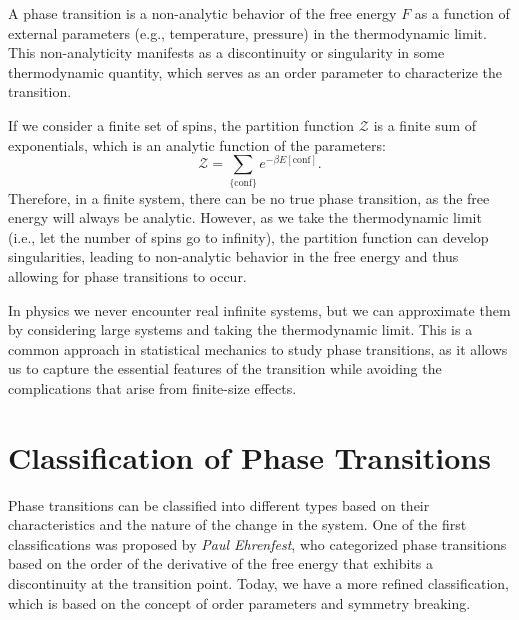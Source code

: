 \begin{definition}
    A phase transition is a non-analytic behavior of the free energy $F$ as a function of external parameters (e.g., temperature, pressure) in the thermodynamic limit. This non-analyticity manifests as a discontinuity or singularity in some thermodynamic quantity, which serves as an order parameter to characterize the transition.
\end{definition}

\begin{example}
    If we consider a finite set of spins, the partition function $\mathcal{Z}$ is a finite sum of exponentials, which is an analytic function of the parameters:
    \[
        \mathcal{Z} = \sum_{\{\text{conf}\}} e^{- \beta E[\text{conf}]}.
    \]
    Therefore, in a finite system, there can be no true phase transition, as the free energy will always be analytic. However, as we take the thermodynamic limit (i.e., let the number of spins go to infinity), the partition function can develop singularities, leading to non-analytic behavior in the free energy and thus allowing for phase transitions to occur.
\end{example}

In physics we never encounter real infinite systems, but we can approximate them by considering large systems and taking the thermodynamic limit. This is a common approach in statistical mechanics to study phase transitions, as it allows us to capture the essential features of the transition while avoiding the complications that arise from finite-size effects.

\section{Classification of Phase Transitions}

Phase transitions can be classified into different types based on their characteristics and the nature of the change in the system. One of the first classifications was proposed by \textit{Paul Ehrenfest}, who categorized phase transitions based on the order of the derivative of the free energy that exhibits a discontinuity at the transition point. Today, we have a more refined classification, which is based on the concept of order parameters and symmetry breaking.

